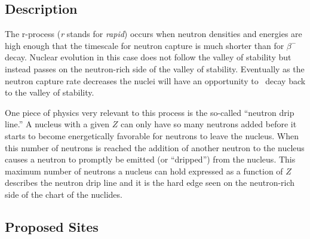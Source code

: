 \subsection{Description}

The r-process ({\it r} stands for {\it rapid}) occurs when neutron
densities and energies are high enough that the timescale for
neutron capture is much shorter than for $\beta^-$ decay.  Nuclear
evolution in this case does not follow the valley of stability but
instead passes on the neutron-rich side of the valley of stability.
Eventually as the neutron capture rate decreases the nuclei will have
an opportunity to \bminus\ decay back to the valley of stability.

One piece of physics very relevant to this process is the so-called
``neutron drip line.''  A nucleus with a given $Z$ can only have so
many neutrons added before it starts to become energetically favorable
for neutrons to leave the nucleus.  When this number of neutrons is
reached the addition of another neutron to the nucleus causes a
neutron to promptly be emitted (or ``dripped'') from the nucleus.
This maximum number of neutrons a nucleus can hold expressed as a
function of $Z$ describes the neutron drip line and it is the hard
edge seen on the neutron-rich side of the chart of the nuclides.


\subsection{Proposed Sites}